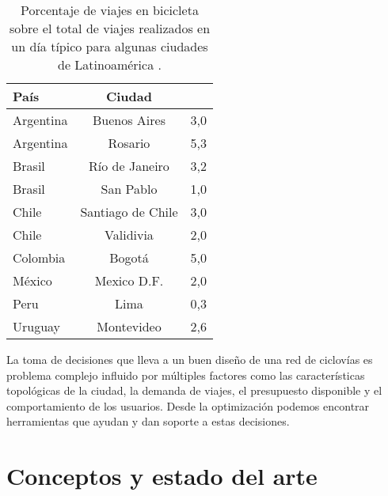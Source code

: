   \begin{table}[h!]
    \centering
      \begin{tabular}{lcS}
      \toprule
      País & Ciudad &  \\
      \midrule
        Argentina & Buenos Aires & 3,0 \\
        Argentina & Rosario & 5,3 \\
        Brasil & Río de Janeiro & 3,2 \\
        Brasil & San Pablo & 1,0 \\
        Chile & Santiago de Chile & 3,0 \\
        Chile & Validivia & 2,0 \\
        Colombia & Bogotá & 5,0 \\
        México & Mexico D.F. & 2,0 \\
        Peru & Lima & 0,3 \\
        Uruguay & Montevideo & 2,6 \\
      \bottomrule
    \end{tabular}
      \caption{Porcentaje de viajes en bicicleta sobre el total de viajes realizados en un día típico para algunas ciudades de Latinoamérica \textcite{Idb2020}.}
      \label{table:bicycleusagelatinamerica}
  \end{table}

  La toma de decisiones que lleva a un buen diseño de una red de ciclovías es problema complejo influido por múltiples factores como las características topológicas de la ciudad, la demanda de viajes, el presupuesto disponible y el comportamiento de los usuarios. Desde la optimización podemos encontrar herramientas que ayudan y dan soporte a estas decisiones.

  \section{Conceptos y estado del arte}



